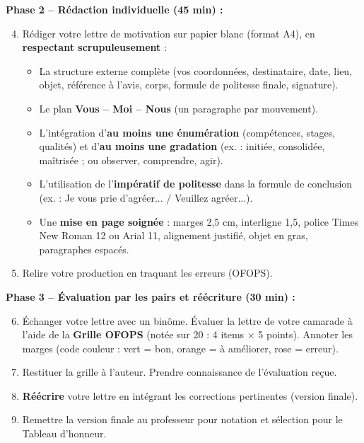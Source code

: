 \documentclass[11pt]{article}
\begin{document}
\par
\textbf{Phase 2 -- Rédaction individuelle (45 min) :}
\begin{enumerate}
    \setcounter{enumi}{3}
    \item Rédiger votre lettre de motivation sur papier blanc (format A4), en \textbf{respectant scrupuleusement} :
    \begin{itemize}
        \item La structure externe complète (vos coordonnées, destinataire, date, lieu, objet, référence à l'avis, corps, formule de politesse finale, signature).
        \item Le plan \textbf{Vous -- Moi -- Nous} (un paragraphe par mouvement).
        \item L'intégration d'\textbf{au moins une énumération} (compétences, stages, qualités) et d'\textbf{au moins une gradation} (ex. : \og{}initiée, consolidée, maîtrisée\fg{} ; ou \og{}observer, comprendre, agir\fg{}).
        \item L'utilisation de l'\textbf{impératif de politesse} dans la formule de conclusion (ex. : \og{}Je vous prie d'agréer...\fg{} / \og{}Veuillez agréer...\fg{}).
        \item Une \textbf{mise en page soignée} : marges 2,5 cm, interligne 1,5, police Times New Roman 12 ou Arial 11, alignement justifié, objet en gras, paragraphes espacés.
    \end{itemize}
    \item Relire votre production en traquant les erreurs (OFOPS).
\end{enumerate}

\par
\textbf{Phase 3 -- Évaluation par les pairs et réécriture (30 min) :}
\begin{enumerate}
    \setcounter{enumi}{5}
    \item Échanger votre lettre avec un binôme. Évaluer la lettre de votre camarade à l'aide de la \textbf{Grille OFOPS} (notée sur 20 : 4 items × 5 points). Annoter les marges (code couleur : \textcolor{popgreen}{vert} = bon, \textcolor{poporange}{orange} = à améliorer, \textcolor{poppink}{rose} = erreur).
    \item Restituer la grille à l'auteur. Prendre connaissance de l'évaluation reçue.
    \item \textbf{Réécrire} votre lettre en intégrant les corrections pertinentes (version finale).
    \item Remettre la version finale au professeur pour notation et sélection pour le Tableau d'honneur.
\end{enumerate}
\end{document}
